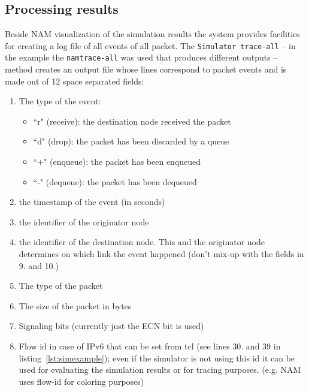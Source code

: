 \documentclass[a4paper]{article}
\begin{document}
\subsection{Processing results}

Beside NAM visualization of the simulation results the system provides facilities for creating a log file of all events
of all packet. The \verb!Simulator trace-all! -- in the example the \verb!namtrace-all! was used that produces
different outputs -- method creates an output file whose lines correspond to packet events and is made out of 12 space
separated fields:
\begin{enumerate}

    \item The type of the event:
          \begin{itemize}
              \item ``r" (receive): the destination node received the packet
              \item ``d" (drop): the packet has been discarded by a queue
              \item ``+" (enqueue): the packet has been enqueued
              \item ``-" (dequeue): the packet has been dequeued
          \end{itemize}

    \item the timestamp of the event (in seconds)

    \item the identifier of the originator node

    \item the identifier of the destination node. This and the originator node determines on which link the event
          happened
          (don't mix-up with the fields in 9. and 10.)

    \item The type of the packet

   \item The size of the packet in bytes

    \item Signaling bits (currently just the ECN bit is used)

    \item Flow id in case of IPv6 that can be set from tcl (see lines 30. and 39 in listing~\ref{lst:simexample}); even
          if
          the simulator is not using this id it can be used for evaluating the simulation results or for tracing purposes. (e.g. NAM
          uses
          flow-id for coloring purposes)


\end{enumerate}
\end{document}
